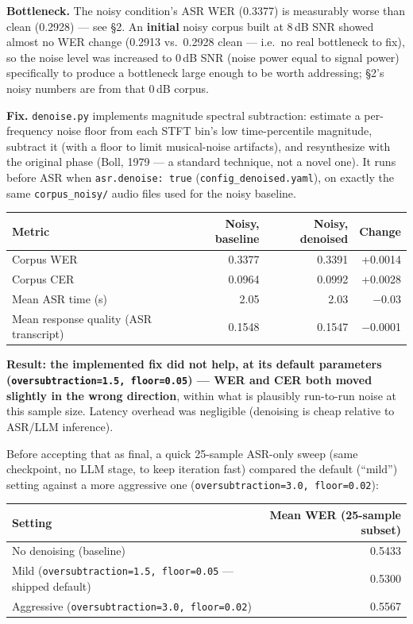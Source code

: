 \documentclass[11pt]{article}
\begin{document}
\textbf{Bottleneck.} The noisy condition's ASR WER (0.3377) is measurably worse than clean (0.2928) --- see \S2. An \textbf{initial} noisy corpus built at 8\,dB SNR showed almost no WER change (0.2913 vs.\ 0.2928 clean --- i.e.\ no real bottleneck to fix), so the noise level was increased to 0\,dB SNR (noise power equal to signal power) specifically to produce a bottleneck large enough to be worth addressing; \S2's noisy numbers are from that 0\,dB corpus.

\textbf{Fix.} \texttt{denoise.py} implements magnitude spectral subtraction: estimate a per-frequency noise floor from each STFT bin's low time-percentile magnitude, subtract it (with a floor to limit musical-noise artifacts), and resynthesize with the original phase (Boll, 1979 --- a standard technique, not a novel one). It runs before ASR when \texttt{asr.denoise: true} (\texttt{config\_denoised.yaml}), on exactly the same \texttt{corpus\_noisy/} audio files used for the noisy baseline.

\begin{center}
\begin{tabular}{lrrr}
\toprule
Metric & Noisy, baseline & Noisy, denoised & Change \\
\midrule
Corpus WER & 0.3377 & 0.3391 & +0.0014 \\
Corpus CER & 0.0964 & 0.0992 & +0.0028 \\
Mean ASR time (s) & 2.05 & 2.03 & $-$0.03 \\
Mean response quality (ASR transcript) & 0.1548 & 0.1547 & $-$0.0001 \\
\bottomrule
\end{tabular}
\end{center}

\textbf{Result: the implemented fix did not help, at its default parameters (\texttt{oversubtraction=1.5, floor=0.05}) --- WER and CER both moved slightly in the wrong direction}, within what is plausibly run-to-run noise at this sample size. Latency overhead was negligible (denoising is cheap relative to ASR/LLM inference).

Before accepting that as final, a quick 25-sample ASR-only sweep (same checkpoint, no LLM stage, to keep iteration fast) compared the default (``mild'') setting against a more aggressive one (\texttt{oversubtraction=3.0, floor=0.02}):

\begin{center}
\begin{tabular}{lr}
\toprule
Setting & Mean WER (25-sample subset) \\
\midrule
No denoising (baseline) & 0.5433 \\
Mild (\texttt{oversubtraction=1.5, floor=0.05} --- shipped default) & 0.5300 \\
Aggressive (\texttt{oversubtraction=3.0, floor=0.02}) & 0.5567 \\
\bottomrule
\end{tabular}
\end{center}
\end{document}

